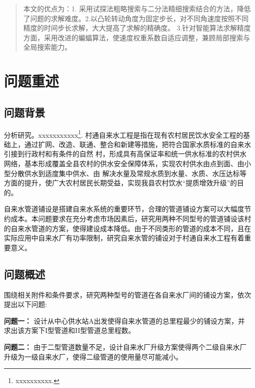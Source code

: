 \documentclass{whutmod}
\newcommand{\upcite}[1]{\textsuperscript{\cite{#1}}}
\begin{document}
\begin{abstract}
		本文的优点为：1. 采用试探法粗略搜索与二分法精细搜索结合的方法，降低了问题的求解难度。2.以凸轮转动角度为固定步长，对不同角速度按照不同精度的时间步长求解，大大提高了求解的精确度。 3.针对智能算法求解精度方面，采用改进的蝙蝠算法，使速度权重系数自适应调整，兼顾局部搜索与全局搜索能力。
		
	\end{abstract}


	\thispagestyle{empty}
	\tableofcontents
	\setcounter{page}{0}                                               
	\newpage	%
	

	
	\section{问题重述}	
		\subsection{问题背景}
	    	分析研究\upcite{1}。xxxxxxxxxxx\footnote{\quad xxxxxxxxxx.}.
	村通自来水工程是指在现有农村居民饮水安全工程的基础上，通过扩网、改造、联通、整合和新建等措施，把符合国家水质标准的自来水引接到行政村和有条件的自然 村，形成具有高保证率和统一供水标准的农村供水网络，基本形成覆盖全县农村的供水安全保障体系，实现农村供水由点到面、由小型分散供水到适度集中供水、由 解决水量及常规水质到水量、水质、水压达标等方面的提升，使广大农村居民长期受益，实现我县农村饮水“提质增效升级”的目的。
	
	自来水管道铺设是搭建自来水系统的重要环节，合理的管道铺设方案可以大幅度节约成本。本问题要求在充分考虑市场因素后，研究用两种不同型号的管道铺设该村的自来水管道的方案，使得建设成本降低。由于不同类形的管道的成本不同，且在实际应用中自来水厂有功率限制，研究自来水管的铺设对于村通自来水工程有着重要意义。
	
		\subsection{问题概述}
		    围绕相关附件和条件要求，研究两种型号的管道在各自来水厂间的铺设方案，依次提出以下问题:
		    
			\textbf{问题一：}
			设计从中心供水站A出发使得自来水管道的总里程最少的铺设方案，并求出该方案下I型管道和II型管道总里程数。
			
			\textbf{问题二：}
			由于二型管道数量不足，设计自来水厂升级方案使得两个二级自来水厂升级为一级自来水厂，使得二级管道的使用量尽可能减小。
			
\end{document}
